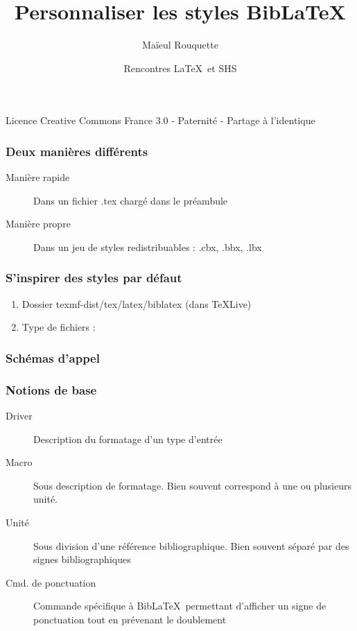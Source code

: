 \documentclass{beamer}
\author{Maïeul Rouquette}
\date{Rencontres \LaTeX\ et SHS}
\title{Personnaliser les styles Bib\LaTeX}
\institute{Université de Lausanne --- IRSB}
\newcommand{\alertdesc}[2]{\item[\alert<+>{#1}]#2}
\begin{document}
\begin{frame}
	\titlepage
	\vfill
	{\tiny Licence Creative Commons France 3.0 - Paternité - Partage à l'identique}
\end{frame}

\begin{frame}
	\frametitle{Deux manières différents}
	\begin{description}
		\alertdesc{Manière rapide}{Dans un fichier .tex chargé dans le préambule}
		\alertdesc{Manière propre}{Dans un jeu de styles redistribuables : .cbx, .bbx, .lbx}
	\end{description}
\end{frame}

\begin{frame}
	\frametitle{S'inspirer des styles par défaut}
	\begin{enumerate}
		\item<1->Dossier texmf-dist/tex/latex/biblatex (dans \TeX Live)
		\item<2->Type de fichiers :
	\end{enumerate}
\end{frame}

\begin{frame}
	\frametitle{Schémas d'appel}
	\footnotesize
\end{frame}

\begin{frame}
	\frametitle{Notions de base}
		\begin{description}
			\alertdesc{Driver}{Description du formatage d'un type d'entrée}
			\alertdesc{Macro}{Sous description de formatage. Bien souvent correspond à une ou plusieurs unité.}
			\alertdesc{Unité}{Sous division d'une référence bibliographique. Bien souvent séparé par des signes bibliographiques}
			\alertdesc{Cmd. de ponctuation}{Commande spécifique à Bib\LaTeX\ permettant d'afficher un signe de ponctuation tout en prévenant le doublement}
		\end{description}
\end{frame}
\end{document}
